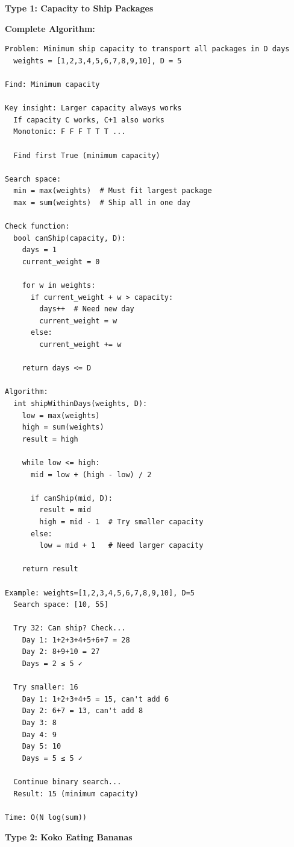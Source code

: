 \documentclass[11pt,a4paper,oneside]{book}
\begin{document}
\begin{tcolorbox}[
    enhanced,breakable,
    colback=successgreen!10,
    colframe=successgreen,
    boxrule=1.5pt,
    arc=3mm,
    title=\textbf{Complete Minimum Answer Algorithms}
]
\textbf{Type 1: Capacity to Ship Packages}

\textbf{Complete Algorithm:}
\begin{verbatim}
Problem: Minimum ship capacity to transport all packages in D days
  weights = [1,2,3,4,5,6,7,8,9,10], D = 5
  
Find: Minimum capacity

Key insight: Larger capacity always works
  If capacity C works, C+1 also works
  Monotonic: F F F T T T ...
  
  Find first True (minimum capacity)

Search space:
  min = max(weights)  # Must fit largest package
  max = sum(weights)  # Ship all in one day

Check function:
  bool canShip(capacity, D):
    days = 1
    current_weight = 0
    
    for w in weights:
      if current_weight + w > capacity:
        days++  # Need new day
        current_weight = w
      else:
        current_weight += w
    
    return days <= D

Algorithm:
  int shipWithinDays(weights, D):
    low = max(weights)
    high = sum(weights)
    result = high
    
    while low <= high:
      mid = low + (high - low) / 2
      
      if canShip(mid, D):
        result = mid
        high = mid - 1  # Try smaller capacity
      else:
        low = mid + 1   # Need larger capacity
    
    return result

Example: weights=[1,2,3,4,5,6,7,8,9,10], D=5
  Search space: [10, 55]
  
  Try 32: Can ship? Check...
    Day 1: 1+2+3+4+5+6+7 = 28
    Day 2: 8+9+10 = 27
    Days = 2 ≤ 5 ✓
    
  Try smaller: 16
    Day 1: 1+2+3+4+5 = 15, can't add 6
    Day 2: 6+7 = 13, can't add 8
    Day 3: 8
    Day 4: 9
    Day 5: 10
    Days = 5 ≤ 5 ✓
  
  Continue binary search...
  Result: 15 (minimum capacity)

Time: O(N log(sum))
\end{verbatim}

\textbf{Type 2: Koko Eating Bananas}


\end{tcolorbox}
\end{document}
